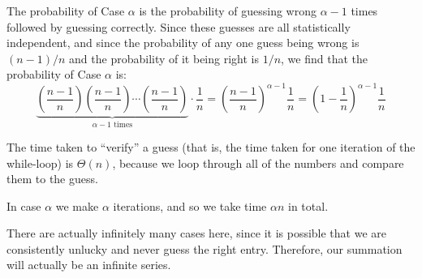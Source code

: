 \begin{prob}
\begin{subprobset}
\begin{subprob}
\begin{soln}
                The probability of Case $\alpha$ is the probability of guessing wrong $\alpha - 1$
                times followed by guessing correctly. Since these guesses are all statistically
                independent, and since the probability of any one guess being wrong is
                $(n - 1)/n$ and the probability of it being right is $1/n$, we find that
                the probability of Case $\alpha$ is:
                \[
                    \underbrace{
                        \left( \frac{n-1}{n} \right)
                        \left( \frac{n-1}{n} \right)
                        \cdots
                        \left( \frac{n-1}{n} \right)
                    }_{\alpha - 1 \text{ times}}
                    \cdot \frac{1}{n}
                    =
                    \left(
                        \frac{n-1}{n}
                    \right)^{\alpha-1} \frac{1}{n}
                    =
                    \left(
                        1 - \frac{1}{n}
                    \right)^{\alpha-1} \frac{1}{n}
                \]

                The time taken to ``verify'' a guess (that is, the time taken for one iteration of the while-loop)
                is $\Theta(n)$, because we loop through all of the numbers and compare them to the guess.

                In case $\alpha$ we make $\alpha$ iterations, and so we take time $\alpha n$ in total.

                There are actually infinitely many cases here, since it is possible that
                we are consistently unlucky and never guess the right entry. Therefore,
                our summation will actually be an infinite series.


\end{soln}
\end{subprob}
\end{subprobset}
\end{prob}
